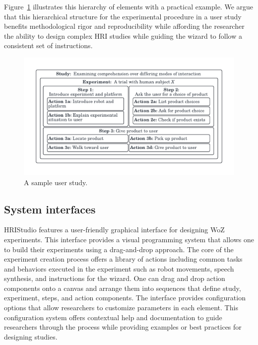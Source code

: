 \documentclass[letterpaper, 10 pt, conference]{ieeeconf}
\begin{document}
Figure~\ref{fig:userstudy} illustrates this hierarchy of elements with a practical example.  We argue that this hierarchical structure for the experimental procedure in a user study benefits methodological rigor and reproducibility while affording the researcher the ability to design complex HRI studies while guiding the wizard to follow a consistent set of instructions.

\begin{figure}[ht]
   \vskip -0.4cm
    \begin{center}
        \includegraphics[width=0.4\paperwidth]{assets/diagrams/userstudy}
        \vskip -0.5cm
        \caption{A sample user study.}
        \label{fig:userstudy}
    \end{center}
\vskip -0.7cm
\end{figure}

\subsection{System interfaces} 

HRIStudio features a user-friendly graphical interface for designing WoZ experiments. This interface provides a visual programming system that allows one to build their experiments using a drag-and-drop approach. The core of the experiment creation process offers a library of actions including common tasks and behaviors executed in the experiment such as robot movements, speech synthesis, and instructions for the wizard. One can drag and drop action components onto a canvas and arrange them into sequences that define  study, experiment, steps, and action components. The interface provides configuration options that allow researchers to customize parameters in each element. This configuration system offers contextual help and documentation to guide researchers through the process while providing examples or best practices for designing studies.
\end{document}
